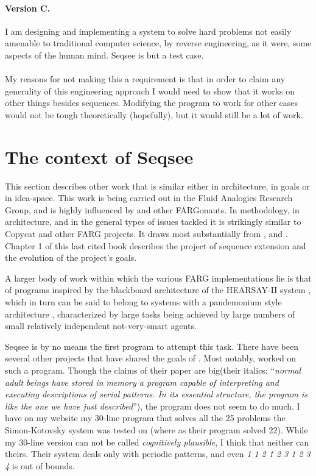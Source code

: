 \documentclass[letterpaper]{article}
\begin{document}
\paragraph{Version C.}  I am designing and implementing a system to solve hard problems not easily amenable to traditional computer science, by reverse engineering, as it were, some aspects of the human mind.  Seqsee is but a test case.

\paragraph{} My reasons for not making this a requirement is that in order to claim any generality of this engineering approach I would need to show that it works on other things besides sequences.  Modifying the program to work for other cases would not be tough theoretically (hopefully), but it would still be a lot of work.

\tableofcontents

\section{The context of Seqsee}
\label{sec:context}

This section describes other work that is similar either in architecture, in goals or in idea-space. This work is being carried out in the Fluid Analogies Research Group, and is highly influenced by \hof and other FARGonauts. In methodology, in architecture, and in the general types of issues tackled it is strikingly similar to Copycat and other FARG projects. It draws most substantially from ,  and . Chapter 1 of this last cited book describes the project of sequence extension and the evolution of the project's goals.

A larger body of work within which the various FARG implementations lie is that of programs inspired by the blackboard architecture of the HEARSAY-II system \cite{Reddy}, which in turn can be said to belong to systems with a pandemonium style architecture \cite{Dennett:Consciousness}, characterized by large tasks being achieved by large numbers of small relatively independent not-very-smart agents. 

Seqsee is by no means the first program to attempt this task. There have been several other projects that have shared the  goals of \seq. Most notably,  worked on such a program. Though the claims of their paper are big(their italics: ``\emph{normal adult beings have stored in memory a program capable of interpreting and executing descriptions of serial patterns. In its essential structure, the program is like the one we have just described}''), the program does not seem to do much. I have on my website \cite{Mahabal:simon} my 30-line program that solves all the 25 problems the Simon-Kotovsky system was tested on (where as their program solved 22). While my 30-line version can not be called \emph{cognitively plausible}, I think that neither can theirs. Their system deals only with periodic patterns, and even \emph{1 1 2 1 2 3 1 2 3 4} is out of bounds.
\end{document}
